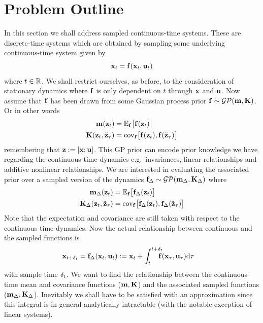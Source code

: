\section{Problem Outline}
In this section we shall address sampled continuous-time systems. These are discrete-time systems which are obtained by sampling some underlying continuous-time system given by
\begin{equation}
\dot{\mathbf{x}}_t = \mathbf{f}(\mathbf{x}_t, \mathbf{u}_t)
\label{eqn:conttime}
\end{equation}
where $t \in \mathbb{R}$. We shall restrict ourselves, as before,  to the consideration of stationary dynamics where $\mathbf{f}$ is only dependent on $t$ through $\mathbf{x}$ and $\mathbf{u}$.  
%
Now assume that $\mathbf{f}$ has been drawn from some Gaussian process prior $\mathbf{f}\sim\mathcal{GP}(\mathbf{m}, \mathbf{K})$. Or in other words
%
\begin{align*}
\mathbf{m}(\mathbf{z}_t) &= \mathbb{E}_{\mathbf{f}}\big[\mathbf{f}(\mathbf{z}_t)\big] \\
\mathbf{K}(\mathbf{z}_t, \tilde{\mathbf{z}}_\tau) &= \mathrm{cov}_{\mathbf{f}}\big[\mathbf{f}(\mathbf{z}_t),\mathbf{f}(\tilde{\mathbf{z}}_\tau)\big]
\end{align*}
%
remembering that $\mathbf{z} := [\mathbf{x};\mathbf{u}]$. This GP prior can encode prior knowledge we have regarding the continuous-time dynamics e.g.\ invariances, linear relationships and additive nonlinear relationships. We are interested in evaluating the associated prior over a sampled version of the dynamics $\mathbf{f}_{\Delta}\sim\mathcal{GP}(\mathbf{m}_\Delta, \mathbf{K}_\Delta)$ where
%
\begin{align*}
\mathbf{m}_\Delta(\mathbf{z}_t) &= \mathbb{E}_{\mathbf{f}}\big[\mathbf{f}_{\Delta}(\mathbf{z}_t)\big] \\
\mathbf{K}_\Delta(\mathbf{z}_t,\tilde{\mathbf{z}}_\tau) &= \mathrm{cov}_{\mathbf{f}}\big[\mathbf{f}_{\Delta}(\mathbf{z}_t),\mathbf{f}_{\Delta}(\tilde{\mathbf{z}}_\tau)\big]
\end{align*}
%
Note that the expectation and covariance are still taken with respect to the continuous-time dynamics. Now the actual relationship between continuous and the sampled functions is
\begin{align}
\mathbf{x}_{t+\delta_t} &= \mathbf{f}_{\Delta}(\mathbf{x}_t,\mathbf{u}_t) := \mathbf{x}_t + \int_{t}^{t+\delta_t} \!\!\!\!\! \mathbf{f}(\mathbf{x}_\tau,\mathbf{u}_\tau) \mathrm{d} \tau
\label{eqn:cont-sample}
\end{align}
with sample time $\delta_t$. We want to find the relationship between the continuous-time mean and covariance functions ($\mathbf{m},\mathbf{K}$) and the associated sampled functions ($\mathbf{m}_\Delta, \mathbf{K}_\Delta$). Inevitably we shall have to be satisfied with an approximation since this integral is in general analytically intractable (with the notable exception of linear systems).

